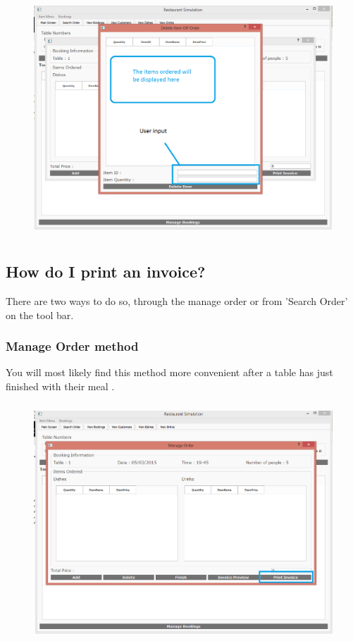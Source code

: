 \begin{figure}[H]
    \includegraphics[height = 9cm]{./Manual/images/DeleteItemOrder2} 
    \caption{} \label{fig:deleteitemorder3}
\end{figure}

\subsection{How do I print an invoice?}
There are two ways to do so, through the manage order or from 'Search Order' on the tool bar.

\subsubsection{Manage Order method}
You will most likely find this method more convenient after a table has just finished with their meal .


\begin{figure}[H]
    \includegraphics[height = 9cm]{./Manual/images/PrintInvoice1} 
    \caption{} \label{fig:printinvoice1}
\end{figure}

